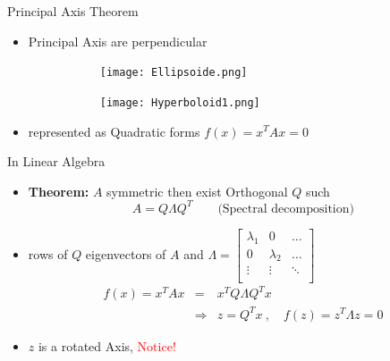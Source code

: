 \documentclass{beamer}
\begin{document}
\begin{frame}{Principal Axis Theorem}
    \begin{itemize}
        \item Principal Axis are perpendicular
        \begin{figure}
            \begin{subfigure}{0.4\textwidth}
                \texttt{[image: Ellipsoide.png]}
            \end{subfigure}\hfill
            \begin{subfigure}{0.4\textwidth}
                \texttt{[image: Hyperboloid1.png]}
            \end{subfigure}
        \end{figure}
        \item represented as Quadratic forms \(f(x) = x^TAx = 0\)
    \end{itemize}
\end{frame}

\begin{frame}{In Linear Algebra}
    \begin{itemize}
        \item \textbf{Theorem:} \(A\) symmetric then exist Orthogonal \(Q\) such
        \[ A = Q \Lambda Q^T \qquad \text{(Spectral decomposition)}\]
        \item rows of \(Q\) eigenvectors of \(A\) and \(
            \Lambda = \begin{bmatrix}
                \lambda_1 & 0 &\dots  \\
                0 & \lambda_2 & \dots \\
                \vdots & \vdots & \ddots \\
            \end{bmatrix} \)
        \begin{eqnarray*}
            f(x) = x^TAx &=& x^TQ \Lambda Q^Tx  \\
            &\Rightarrow & z = Q^Tx \ , \quad  f(z) = z^T\Lambda z = 0
        \end{eqnarray*}
        \item \(z\) is a rotated Axis, \textcolor{red}{Notice!}
    \end{itemize}
\end{frame}
\end{document}

